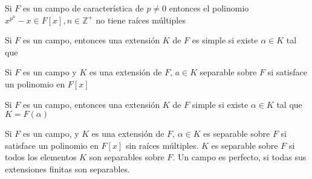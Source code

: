 \begin{corolario}
    Si $F$ es un campo de característica de $p\neq 0$ entonces el polinomio $x^{p^n}-x\in F[x],n\in\mathbb{Z}^+$ no tiene raíces múltiples 
\end{corolario}

\begin{definicion}
    Si $F$ es un campo, entonces una extensión $K$ de $F$ es simple si existe $\alpha\in K$ tal que 
\end{definicion}

\begin{definicion}
    Si $F$ es un campo y $K$ es una extensión de $F$, $a\in K$ separable sobre $F$ si satisface un polinomio en $F[x]$
\end{definicion}

\begin{definicion}
    Si $F$ es un campo, entonces una extensión $K$ de $F$ simple si existe $\alpha\in K$ tal que $K=F(\alpha)$
\end{definicion}

\begin{definicion}
    Si $F$ es un campo, y $K$ es una extensión de $F$, $\alpha \in K$ es separable sobre $F$ si satisface un polinomio en $F[x]$ sin raíces múltiples. $K$ es separable sobre $F$ si todos los elementos $K$ son separables sobre $F$. Un campo es perfecto, si todas sus extensiones finitas son separables. 
\end{definicion}


